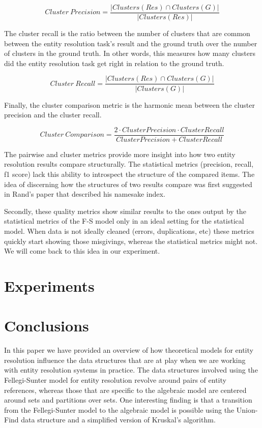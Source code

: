 \documentclass[lettersize,journal]{IEEEtran}
\begin{document}
    \[
        Cluster~Precision = \frac{|Clusters(Res) \cap Clusters(G)|}{
            |Clusters(Res)|
        }
    \]

    The cluster recall is the ratio between the number of clusters that are
    common between the entity resolution task's result and the ground truth over
    the number of clusters in the ground truth.
    In other words, this measures how many clusters did the entity resolution
    task get right in relation to the ground truth.

    \[
        Cluster~Recall = \frac{|Clusters(Res) \cap Clusters(G)|}{
            |Clusters(G)|
        }
    \]

    Finally, the cluster comparison metric is the harmonic mean between the
    cluster precision and the cluster recall.

    \[
        Cluster~Comparison = \frac{
            2 \cdot Cluster Precision \cdot Cluster Recall
        }{Cluster Precision + Cluster Recall}
    \]

    The pairwise and cluster metrics provide more insight into how two entity
    resolution results compare structurally.
    The statistical metrics (precision, recall, f1 score) lack this ability to
    introspect the structure of the compared items.
    The idea of discerning how the structures of two results compare was first
    suggested in Rand's paper that described his namesake index\cite{rand1971}.
    
    Secondly, these quality metrics show similar results to the ones output by
    the statistical metrics of the F-S model only in an ideal setting for the
    statistical model.
    When data is not ideally cleaned (errors, duplications, etc) these metrics
    quickly start showing those misgivings, whereas the statistical metrics
    might not.
    We will come back to this idea in our experiment.

    \section{Experiments}\label{sec:experiments}
    

    \section[conclusion]{Conclusions}\label{sec:conclusions}

    In this paper we have provided an overview of how theoretical models for
    entity resolution influence the data structures that are at play when we are
    working with entity resolution systems in practice.
    The data structures involved using the Fellegi-Sunter model for entity
    resolution revolve around pairs of entity references, whereas those that
    are specific to the algebraic model are centered around sets and partitions
    over sets.
    One interesting finding is that a transition from the Fellegi-Sunter model
    to the algebraic model is possible using the Union-Find data structure and
    a simplified version of Kruskal's algorithm.
\end{document}
